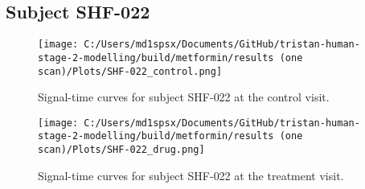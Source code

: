 \documentclass{epflreport}%
\begin{document}
\subsection{Subject SHF{-}022}%
\label{subsec:SubjectSHF{-}022}%

%


\begin{figure}[h!]%
\centering%
\texttt{[image: C:/Users/md1spsx/Documents/GitHub/tristan-human-stage-2-modelling/build/metformin/results (one scan)/Plots/SHF-022\_control.png]}%
\caption{Signal{-}time curves for subject SHF{-}022 at the control visit.}%
\end{figure}

%


\begin{figure}[h!]%
\centering%
\texttt{[image: C:/Users/md1spsx/Documents/GitHub/tristan-human-stage-2-modelling/build/metformin/results (one scan)/Plots/SHF-022\_drug.png]}%
\caption{Signal{-}time curves for subject SHF{-}022 at the treatment visit.}%
\end{figure}
\end{document}
